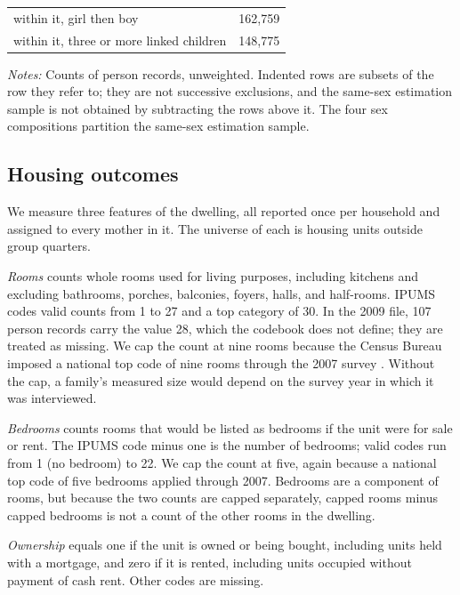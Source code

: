 \begin{table}[htbp]
\begin{tabular}{@{}lr@{}}
\quad within it, girl then boy & 162,759 \\
\quad within it, three or more linked children & 148,775 \\
\bottomrule
\end{tabular}
\par\medskip
\begin{minipage}{0.95\linewidth}
\footnotesize\textit{Notes:} Counts of person records, unweighted. Indented rows
are subsets of the row they refer to; they are not successive exclusions, and the
same-sex estimation sample is not obtained by subtracting the rows above it. The
four sex compositions partition the same-sex estimation sample.
\end{minipage}
\end{table}

\subsection{Housing outcomes}
\label{app:acs_iv_outcomes}

We measure three features of the dwelling, all reported once per household and
assigned to every mother in it. The universe of each is housing units outside group
quarters.

\emph{Rooms} counts whole rooms used for living purposes, including kitchens and
excluding bathrooms, porches, balconies, foyers, halls, and half-rooms. IPUMS codes
valid counts from 1 to 27 and a top category of 30. In the 2009 file, 107 person
records carry the value 28, which the codebook does not define; they are treated as
missing. We cap the count at nine rooms because the Census Bureau imposed a
national top code of nine rooms through the 2007 survey \citep{ipumsusa_vardocs}.
Without the cap, a family's measured size would depend on the survey year in which
it was interviewed.

\emph{Bedrooms} counts rooms that would be listed as bedrooms if the unit were for
sale or rent. The IPUMS code minus one is the number of bedrooms; valid codes run
from 1 (no bedroom) to 22. We cap the count at five, again because a national top
code of five bedrooms applied through 2007. Bedrooms are a component of rooms, but
because the two counts are capped separately, capped rooms minus capped bedrooms is
not a count of the other rooms in the dwelling.

\emph{Ownership} equals one if the unit is owned or being bought, including units
held with a mortgage, and zero if it is rented, including units occupied without
payment of cash rent. Other codes are missing.

